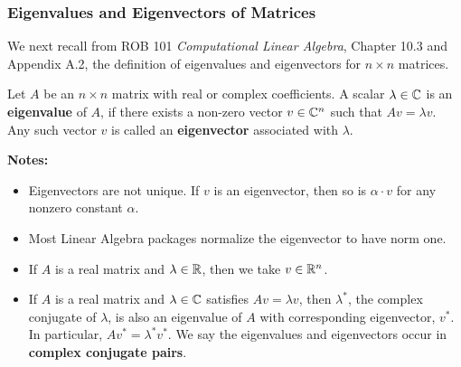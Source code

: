 \subsubsection{Eigenvalues and Eigenvectors of Matrices}
We next recall from ROB 101 \textit{Computational Linear Algebra}, Chapter 10.3 and Appendix A.2, the definition of eigenvalues and eigenvectors for $n \times n$ matrices.

\bigskip
\begin{tcolorbox}[colback=mylightblue, title = {\bf Definition of Eigenvalues and Eigenvectors}, breakable]
%
\begin{definition}
\label{def:EignStuff}
  Let $A$ be an $n\times n$ matrix with real or complex coefficients. A scalar $\lambda \in  \mathbb C$ is an \textbf{eigenvalue} of $A$, if there exists a non-zero vector $v \in \mathbb C^{n}$ such that $Av=\lambda v$. Any such vector $v$ is called an \textbf{eigenvector} associated with $\lambda$. \\
\end{definition}
 
\textbf{Notes:} 
\begin{itemize}
    \item Eigenvectors are not unique. If $v$ is an eigenvector, then so is $\alpha \cdot v$ for any nonzero constant $\alpha$. 
    \item Most Linear Algebra packages normalize the eigenvector to have norm one.
    \item If $A$ is a real matrix and $\lambda \in \mathbb R$, then we take $v \in \mathbb R^n$.
    \item If $A$ is a real matrix and $\lambda \in \mathbb C$ satisfies $Av = \lambda v$, then $\lambda^\ast$, the complex conjugate of $\lambda$, is also an eigenvalue of $A$ with corresponding eigenvector, $v^\ast$. In particular, $A v^\ast = \lambda^\ast v^\ast$. We say the eigenvalues and eigenvectors occur in \textbf{complex conjugate pairs}.
\end{itemize} 
\end{tcolorbox}


\bigskip
\begin{center}
\setlength{\fboxrule}{2pt}  %
\end{center}

